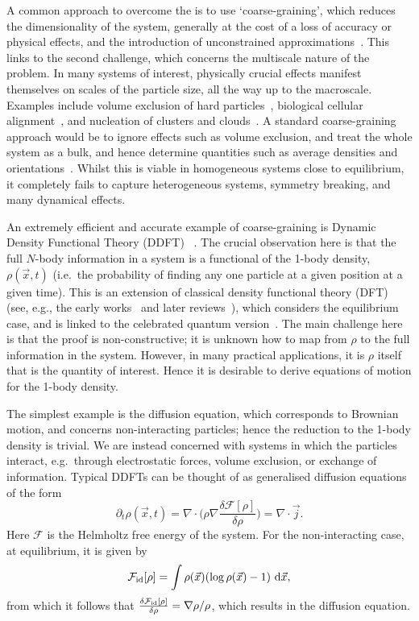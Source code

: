 A common approach to overcome the is to use `coarse-graining', which reduces the dimensionality of the system,
generally at the cost of a loss of accuracy or physical effects, and the introduction of unconstrained approximations~\cite{V08}.  
This links to the second challenge, which concerns the multiscale nature of the problem.  In many systems of interest, physically
crucial effects manifest themselves on scales of the particle size, all the way up to the macroscale.  Examples
include volume exclusion of hard particles~\cite{BC12}, biological cellular alignment~\cite{ANHetal10}, 
and nucleation of clusters and clouds~\cite{L12}.
A standard coarse-graining approach would be to ignore effects such as volume exclusion, and treat the whole
system as a bulk, and hence determine quantities such as average densities and orientations~\cite{LL94}.  Whilst this is viable
in homogeneous systems close to equilibrium, it completely fails to capture heterogeneous systems, symmetry breaking,
and many dynamical effects.

An extremely efficient and accurate example of coarse-graining is Dynamic Density Functional Theory (DDFT)
~\cite{MT99,CF05}.
The crucial observation here is that the full $N$-body information in a system is a functional of the 1-body density,
$\rho(\vec{x},t)$ (i.e.\ the probability of finding any one particle at a given position at a given time).  This is an extension of 
classical density functional theory (DFT) (see, e.g., the early works~\cite{E79,RD85} 
and later reviews~\cite{W06,WL07,L10}), which considers the equilibrium case, and is linked to the celebrated
quantum version~\cite{HK64}.  The main challenge here is that the proof is non-constructive; it is unknown how to 
map from $\rho$ to the full information in the system.  However, in many practical applications, it is $\rho$ itself
that is the quantity of interest.  Hence it is desirable to derive equations of motion for the 1-body density.

The simplest example is the diffusion equation, which corresponds to Brownian motion, and concerns non-interacting
particles; hence the reduction to the 1-body density is trivial.  We are instead concerned with systems in which the 
particles interact, e.g.\ through electrostatic forces, volume exclusion, or exchange of information.  Typical DDFTs
can be thought of as generalised diffusion equations of the form
\begin{equation}
	\partial_t \rho (\vec{x},t) = \nabla \cdot \Big( \rho \nabla \frac{\delta \mathcal{F}[\rho]}{\delta \rho} \Big) = \nabla \cdot \vec{j}.
	\label{eq:DDFT}
\end{equation}
Here $\mathcal{F}$ is the Helmholtz free energy of the system.  For the non-interacting case, at equilibrium, 
it is given by
\[
	\mathcal{F}_{\rm id}[\rho] = \int \rho(\vec{x})( \log \rho(\vec{x}) -1 )~ {\rm d} \vec{x},
\]	
from which it follows that $\frac{\delta \mathcal{F}_{\rm id} [\rho]}{\delta \rho} = \nabla\rho / \rho$, which results in
the diffusion equation.  

